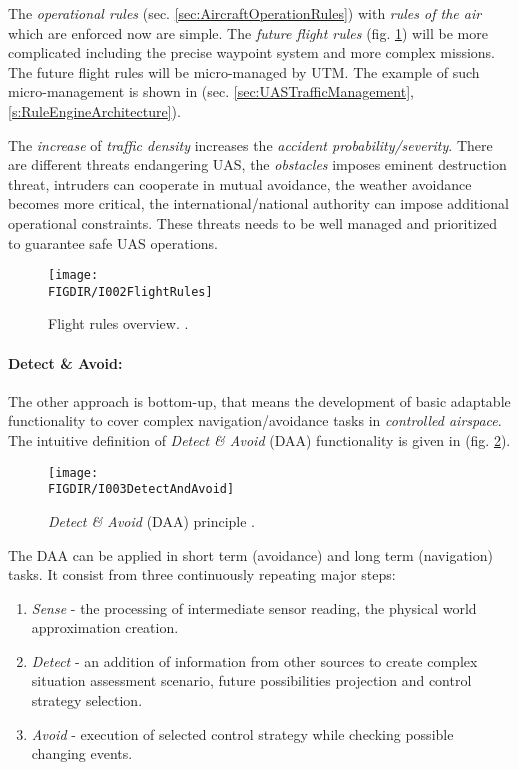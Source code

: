 The \emph{operational rules} (sec. \ref{sec:AircraftOperationRules}) with \emph{rules of the air} \cite{icaoAnnex2} which are enforced now are simple. The \emph{future flight rules} (fig. \ref{fig:flightRulesIntro}) will be more complicated including the precise waypoint system and more complex missions. The future flight rules will be micro-managed by UTM. The example of such micro-management is shown in (sec. \ref{sec:UASTrafficManagement}, \ref{s:RuleEngineArchitecture}). 

The \emph{increase} of \emph{traffic density} increases the \emph{accident probability/severity}.  There are different threats endangering UAS, the \emph{obstacles} imposes eminent destruction threat, intruders can cooperate in mutual avoidance, the weather avoidance becomes more critical, the international/national authority can impose additional operational constraints. These threats needs to be well managed and prioritized to guarantee safe UAS operations.

\begin{figure}[H]
    \centering
    \texttt{[image: \\FIGDIR/I002FlightRules]}
    \caption{Flight rules overview. \cite{airbusUTM2018blueprint}.}
    \label{fig:flightRulesIntro}
\end{figure}

\paragraph{Detect \& Avoid:} The other approach is bottom-up, that means the development of basic adaptable functionality to cover complex navigation/avoidance tasks in \emph{controlled airspace}. The intuitive definition of \emph{Detect \& Avoid} (DAA) functionality is given in (fig. \ref{fig:detectAdnAvoidIntroduction}).

\begin{figure}[H]
    \centering
    \texttt{[image: \\FIGDIR/I003DetectAndAvoid]}
    \caption{\emph{Detect \& Avoid} (DAA) principle \cite{jenie2014velocity}.}
    \label{fig:detectAdnAvoidIntroduction}
\end{figure}

\noindent The DAA can be applied in short term (avoidance) and long term (navigation) tasks. It consist from three continuously repeating major steps:
\begin{enumerate}
    \item \emph{Sense} - the processing of intermediate sensor reading, the physical world approximation creation.
    
    \item \emph{Detect} - an addition of information from other sources to create complex situation assessment scenario, future possibilities projection and control strategy selection.
    
    \item \emph{Avoid} - execution of selected control strategy while checking possible changing events.
\end{enumerate}

